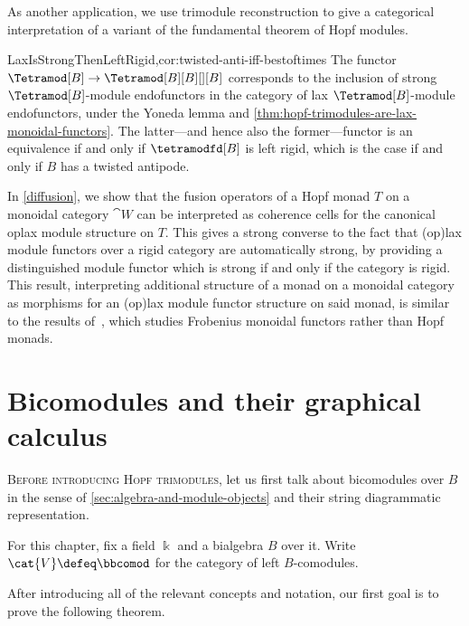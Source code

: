 As another application, we use trimodule reconstruction
to give a categorical interpretation of a variant of the fundamental theorem of Hopf modules.

\begin{reptheorem}{LaxIsStrongThenLeftRigid,cor:twisted-anti-iff-bestoftimes}
  The functor \(\Tetramod[B] \to \Tetramod[B][B][][B]\) corresponds to
  the inclusion of strong \(\Tetramod[B]\)\hyp{}module endofunctors in the category of lax \(\Tetramod[B]\)\hyp{}module endofunctors,
  under the Yoneda lemma and \cref{thm:hopf-trimodules-are-lax-monoidal-functors}.
  The latter—and hence also the former—functor is an equivalence if and only if
  \(\tetramodfd[B]\) is left rigid,
  which is the case if and only if \(B\) has a twisted antipode.
\end{reptheorem}

In \cref{diffusion},
we show that the fusion operators of a Hopf monad \(T\) on a monoidal category \(\cat{W}\)
can be interpreted as coherence cells for the canonical oplax module structure on \(T\).
This gives a strong converse to the fact that (op)lax module functors over a rigid category are automatically strong,
by providing a distinguished module functor which is strong if and only if the category is rigid.
This result, interpreting additional structure of a monad on a monoidal category as morphisms for an (op)lax module functor structure on said monad,
is similar to the results of~\cite[Theorems~3.17 and~3.18]{flake24:froben-drinf},
which studies Frobenius monoidal functors rather than Hopf monads.

\section{Bicomodules and their graphical calculus}\label{sec:bicomodules}

\textsc{Before introducing Hopf trimodules},
let us first talk about bicomodules over \(B\)
in the sense of \cref{sec:algebra-and-module-objects}
and their string diagrammatic representation.

\begin{hypothesis}\label{hyp:hopf-trimodule}
  For this chapter, fix a field \(\Bbbk\) and a bialgebra \(B\) over it.
  Write \(\cat{V} \defeq \bbcomod\) for the category of left \(B\)\hyp{}comodules.
\end{hypothesis}

After introducing all of the relevant concepts and notation,
our first goal is to prove the following theorem.

